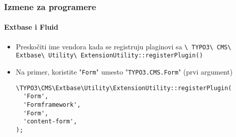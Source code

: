\begin{frame}[fragile]
	\frametitle{Izmene za programere}
	\framesubtitle{Extbase i Fluid}

	\lstset{basicstyle=\smaller\ttfamily}

	\begin{itemize}
		\item Preskočiti ime vendora kada se registruju plaginovi sa\newline
			\smaller
				\texttt{\textbackslash
					TYPO3\textbackslash
					CMS\textbackslash
					Extbase\textbackslash
					Utility\textbackslash
					ExtensionUtility::registerPlugin()}
			\normalsize

		\item Na primer, koristite "\texttt{Form}" umesto "\texttt{TYPO3.CMS.Form}"\newline
			\small(prvi argument)\normalsize

\begin{lstlisting}
\TYPO3\CMS\Extbase\Utility\ExtensionUtility::registerPlugin(
  'Form',
  'Formframework',
  'Form',
  'content-form',
);
\end{lstlisting}

	\end{itemize}

\end{frame}


